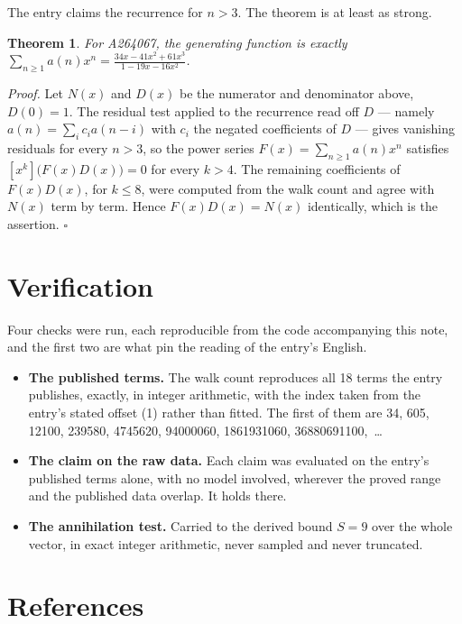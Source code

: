 \documentclass[11pt]{article}
\newtheorem{theorem}{Theorem}
\theoremstyle{definition}
\begin{document}
The entry claims the recurrence for $n > 3$. The theorem is at least as strong.

\begin{theorem} For A264067, the generating function is exactly $\sum_{n\ge 1} a(n)x^n = \frac{34x - 41x^{2} + 61x^{3}}{1 - 19x - 16x^{2}}$.\end{theorem}

{\itshape Proof.} Let $N(x)$ and $D(x)$ be the numerator and denominator above, $D(0)=1$. The residual test applied to the recurrence read off $D$ --- namely $a(n) = \sum_i c_i a(n-i)$ with $c_i$ the negated coefficients of $D$ --- gives vanishing residuals for every $n > 3$, so the power series $F(x)=\sum_{n\ge 1}a(n)x^n$ satisfies $[x^k]\bigl(F(x)D(x)\bigr) = 0$ for every $k > 4$. The remaining coefficients of $F(x)D(x)$, for $k \le 8$, were computed from the walk count and agree with $N(x)$ term by term. Hence $F(x)D(x) = N(x)$ identically, which is the assertion. $\square$

\section{Verification}

Four checks were run, each reproducible from the code accompanying this note, and the first two are what pin the reading of the entry's English.

\begin{itemize}

\item {\bfseries The published terms.} The walk count reproduces all 18 terms the entry publishes, exactly, in integer arithmetic, with the index taken from the entry's stated offset (1) rather than fitted. The first of them are 34, 605, 12100, 239580, 4745620, 94000060, 1861931060, 36880691100,~\dots

\item {\bfseries The claim on the raw data.} Each claim was evaluated on the entry's published terms alone, with no model involved, wherever the proved range and the published data overlap. It holds there.

\item {\bfseries The annihilation test.} Carried to the derived bound $S = 9$ over the whole vector, in exact integer arithmetic, never sampled and never truncated.

\end{itemize}

\section{References}
\end{document}
